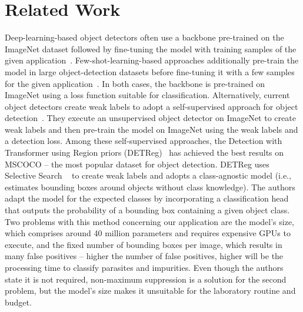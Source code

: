\documentclass[times,twocolumn,final,authoryear]{elsarticle}
\begin{document}
\section{Related Work}\label{sec:related-work}
     Deep-learning-based object detectors often use a backbone pre-trained on the ImageNet dataset followed by fine-tuning the model with training samples of the given application~\cite{liu2020deep,huang2021survey}. Few-shot-learning-based approaches additionally pre-train the model in large object-detection datasets before fine-tuning it with a few samples for the given application~\cite{kang2019few,wu2020multi,yan2019meta}. In both cases, the backbone is pre-trained on ImageNet using a loss function suitable for classification. Alternatively, current object detectors create weak labels to adopt a self-supervised approach for object detection~\cite{bar2021detreg,o2020unsupervised,wei2021aligning,yang2021instance}. They execute an unsupervised object detector on ImageNet to create weak labels and then pre-train the model on ImageNet using the weak labels and a detection loss. Among these self-supervised approaches, the Detection with Transformer using Region priors (DETReg)~\cite{bar2021detreg} has achieved the best results on MSCOCO \cite{lin2014microsoft} -- the most popular dataset for object detection. DETReg uses Selective Search ~\cite{uijlings2013selective} to create weak labels and adopts a class-agnostic model (i.e., estimates bounding boxes around objects without class knowledge). The authors adapt the model for the expected classes by incorporating a classification head that outputs the probability of a bounding box containing a given object class. Two problems with this method concerning our application are the model's size, which comprises around 40 million parameters and requires expensive GPUs to execute, and the fixed number of bounding boxes per image, which results in many false positives --  higher the number of false positives, higher will be the processing time to classify parasites and impurities. Even though the authors state it is not required, non-maximum suppression is a solution for the second problem, but the model's size makes it unsuitable for the laboratory routine and budget.
     
\end{document}
